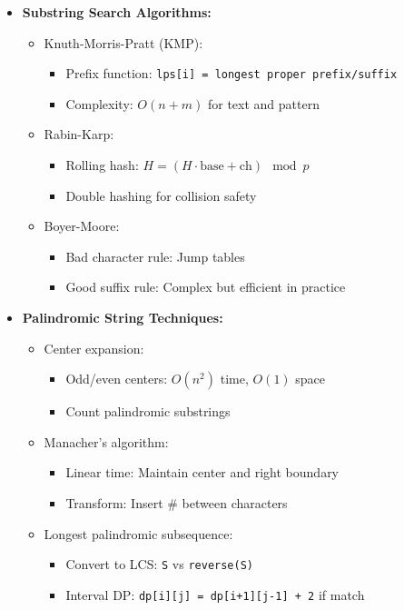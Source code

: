 \documentclass[a4paper,10pt]{book}
\begin{document}
\begin{itemize}
    \item \textbf{Substring Search Algorithms:}
    \begin{itemize}
        \item Knuth-Morris-Pratt (KMP):
        \begin{itemize}
            \item Prefix function: \texttt{lps[i] = longest proper prefix/suffix}
            \item Complexity: $O(n + m)$ for text and pattern
        \end{itemize}
        \item Rabin-Karp:
        \begin{itemize}
            \item Rolling hash: $H = (H \cdot \text{base} + \text{ch}) \mod p$
            \item Double hashing for collision safety
        \end{itemize}
        \item Boyer-Moore:
        \begin{itemize}
            \item Bad character rule: Jump tables
            \item Good suffix rule: Complex but efficient in practice
        \end{itemize}
    \end{itemize}
    
    \item \textbf{Palindromic String Techniques:}
    \begin{itemize}
        \item Center expansion:
        \begin{itemize}
            \item Odd/even centers: $O(n^2)$ time, $O(1)$ space
            \item Count palindromic substrings
        \end{itemize}
        \item Manacher's algorithm:
        \begin{itemize}
            \item Linear time: Maintain center and right boundary
            \item Transform: Insert \# between characters
        \end{itemize}
        \item Longest palindromic subsequence:
        \begin{itemize}
            \item Convert to LCS: \texttt{S} vs \texttt{reverse(S)}
            \item Interval DP: \texttt{dp[i][j] = dp[i+1][j-1] + 2} if match
        \end{itemize}
    \end{itemize}
    

\end{itemize}
\end{document}
